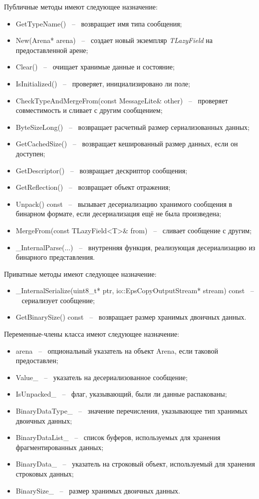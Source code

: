 Публичные методы имеют следующее назначение:
\begin{itemize}
    \item GetTypeName() ~--~ возвращает имя типа сообщения;
    \item New(Arena* arena) ~--~ создает новый экземпляр \textit{TLazyField} на предоставленной арене;
    \item Clear() ~--~ очищает хранимые данные и состояние;
    \item IsInitialized() ~--~ проверяет, инициализировано ли поле;
    \item CheckTypeAndMergeFrom(const MessageLite\& other) ~--~ проверяет совместимость и сливает с другим сообщением;
    \item ByteSizeLong() ~--~ возвращает расчетный размер сериализованных данных;
    \item GetCachedSize() ~--~ возвращает кешированный размер данных, если он доступен;
    \item GetDescriptor() ~--~ возвращает дескриптор сообщения;
    \item GetReflection() ~--~ возвращает объект отражения;
    \item Unpack() const ~--~ вызывает десериализацию хранимого сообщения в бинарном формате, если десериализация ещё не была произведена;
    \item MergeFrom(const TLazyField<T>\& from) ~--~ сливает сообщение с другим;
    \item \_InternalParse(...) ~--~ внутренняя функция, реализующая десериализацию из бинарного представления.
\end{itemize}

Приватные методы имеют следующее назначение:

\begin{itemize}
    \item \_InternalSerialize(uint8\_t* ptr, io::EpsCopyOutputStream* stream) const ~--~ сериализует сообщение;
    \item GetBinarySize() const ~--~ возвращает размер хранимых двоичных данных.
\end{itemize}

Переменные-члены класса имеют следующее назначение:

\begin{itemize}
    \item arena ~--~ опциональный указатель на объект Arena, если таковой предоставлен;
    \item Value\_ ~--~ указатель на десериализованное сообщение;
    \item IsUnpacked\_ ~--~ флаг, указывающий, были ли данные распакованы;
    \item BinaryDataType\_ ~--~ значение перечисления, указывающее тип хранимых двоичных данных;
    \item BinaryDataList\_ ~--~ список буферов, используемых для хранения фрагментированных данных;
    \item BinaryData\_ ~--~ указатель на строковый объект, используемый для хранения строковых данных;
    \item BinarySize\_ ~--~ размер хранимых двоичных данных.
\end{itemize}


